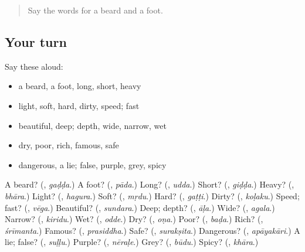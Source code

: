\label{lesson:KA-R144-second-pass-the-body-and-describing-words}



\begin{quote}
Say the words for a beard and a foot.
\end{quote}

\subsection*{Your turn}
Say these aloud:

\begin{itemize}
\raggedright
  \item a beard, a foot, long, short, heavy
  \item light, soft, hard, dirty, speed; fast
  \item beautiful, deep; depth, wide, narrow, wet
  \item dry, poor, rich, famous, safe
  \item dangerous, a lie; false, purple, grey, spicy
\end{itemize}

\begin{tcolorbox}[breakable,colback=teal!4,colframe=teal!35!black,title={Before you move on}]
A beard? (\textbf{}, \emph{gaḍḍa}.) A foot? (\textbf{}, \emph{pāda}.) Long? (\textbf{}, \emph{udda}.) Short? (\textbf{}, \emph{giḍḍa}.) Heavy? (\textbf{}, \emph{bhāra}.) Light? (\textbf{}, \emph{hagura}.) Soft? (\textbf{}, \emph{mṛdu}.) Hard? (\textbf{}, \emph{gaṭṭi}.) Dirty? (\textbf{}, \emph{koḷaku}.) Speed; fast? (\textbf{}, \emph{vēga}.) Beautiful? (\textbf{}, \emph{sundara}.) Deep; depth? (\textbf{}, \emph{āḷa}.) Wide? (\textbf{}, \emph{agala}.) Narrow? (\textbf{}, \emph{kiridu}.) Wet? (\textbf{}, \emph{odde}.) Dry? (\textbf{}, \emph{oṇa}.) Poor? (\textbf{}, \emph{baḍa}.) Rich? (\textbf{}, \emph{śrīmanta}.) Famous? (\textbf{}, \emph{prasiddha}.) Safe? (\textbf{}, \emph{surakṣita}.) Dangerous? (\textbf{}, \emph{apāyakāri}.) A lie; false? (\textbf{}, \emph{suḷḷu}.) Purple? (\textbf{}, \emph{nēraḷe}.) Grey? (\textbf{}, \emph{būdu}.) Spicy? (\textbf{}, \emph{khāra}.)
\end{tcolorbox}
